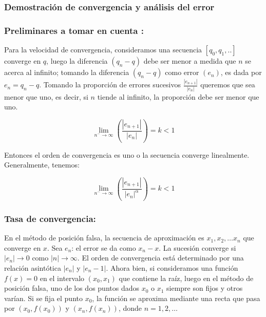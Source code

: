 \subsubsection{Demostración de convergencia y análisis del error}

\subsubsection{Preliminares a tomar en cuenta \cite{MR_PDF}:}

Para la velocidad de convergencia, consideramos una secuencia $ [q_0,q_1,..] $ converge en $ q $, luego la diferencia $ (q_n - q) $ debe ser menor a medida que $ n $ se acerca al infinito; tomando la diferencia $ (q_n - q) $ como error $ (e_n) $, es dada por $ e_n = q_n - q $.\newline\newline
Tomando la proporción de errores sucesivos $ \frac{|e_{n+1}|}{|e_n|} $ queremos que sea menor que uno, es decir, si $ n $ tiende al infinito, la proporción debe ser menor que uno.

\begin{displaymath}
    \lim_{n^{-} \to \infty} (\frac{|e_{n+1}|}{|e_n|}) = k < 1
\end{displaymath}
	
Entonces el orden de convergencia es uno o la secuencia converge linealmente.\newline
Generalmente, tenemos:

\begin{displaymath}
    \lim_{n^{-} \to \infty} (\frac{|e_{n+1}|}{|e_n|^\alpha}) = k < 1
\end{displaymath}

\subsubsection{Tasa de convergencia:}

En el método de posición falsa, la secuencia de aproximación es $ {x_1,x_2,\ldots x_n} $ que converge en $ x $. Sea $ e_n $: el error se da como $ x_n - x $. La sucesión converge si $ |e_n| \rightarrow 0 $ como $ |n| \rightarrow \infty $. El orden de convergencia está determinado por una relación asintótica $ |e_n| $ y $ |e_n - 1| $. Ahora bien, si consideramos una función $ f(x)=0 $ en el intervalo $ (x_0, x_1) $ que contiene la raíz, luego en el método de posición falsa, uno de los dos puntos dados $ x_0 $ o $ x_1 $ siempre son fijos y otros varían. Si se fija el punto $ x_0 $, la función se aproxima mediante una recta que pasa por $ (x_0, f(x_0)) $ y $ (x_n, f(x_n)) $, donde $ n=1,2,\ldots $

